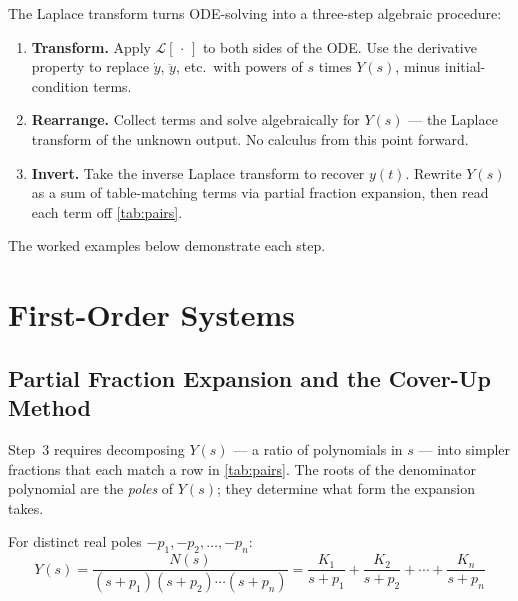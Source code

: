 \documentclass[12pt]{article}
\begin{document}
The Laplace transform turns ODE-solving into a three-step algebraic procedure:

\begin{enumerate}
  \item \textbf{Transform.}  Apply $\mathcal{L}[\,\cdot\,]$ to both sides of
    the ODE.  Use the derivative property to replace $\dot{y}$, $\ddot{y}$,
    etc.\ with powers of $s$ times $Y(s)$, minus initial-condition terms.

  \item \textbf{Rearrange.}  Collect terms and solve algebraically for $Y(s)$
    --- the Laplace transform of the unknown output.  No calculus from this
    point forward.

  \item \textbf{Invert.}  Take the inverse Laplace transform to recover $y(t)$.
    Rewrite $Y(s)$ as a sum of table-matching terms via partial fraction
    expansion, then read each term off \cref{tab:pairs}.
\end{enumerate}

The worked examples below demonstrate each step.

\section{First-Order Systems}
\label{sec:first_order}

\subsection{Partial Fraction Expansion and the Cover-Up Method}
\label{sec:pfe}

Step~3 requires decomposing $Y(s)$ --- a ratio of polynomials in $s$ --- into
simpler fractions that each match a row in \cref{tab:pairs}.  The roots of the
denominator polynomial are the \emph{poles} of $Y(s)$; they determine what
form the expansion takes.

For distinct real poles $-p_1, -p_2, \ldots, -p_n$:
\begin{equation}
  Y(s) = \frac{N(s)}{(s+p_1)(s+p_2)\cdots(s+p_n)}
        = \frac{K_1}{s+p_1} + \frac{K_2}{s+p_2} + \cdots + \frac{K_n}{s+p_n}
  \label{eq:pfe}
\end{equation}
\end{document}
